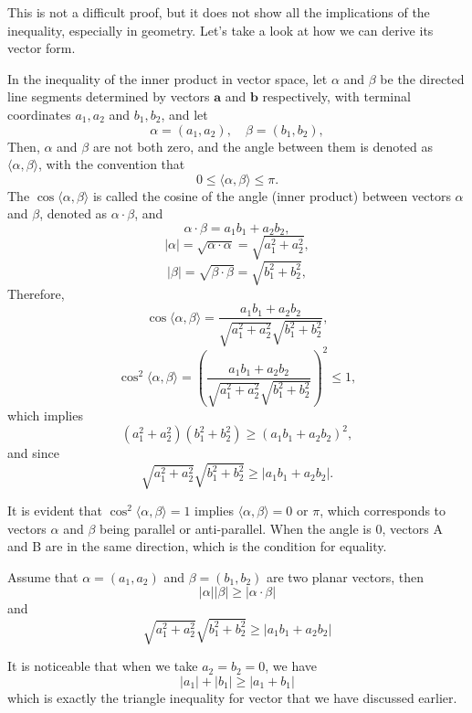 \documentclass[
	12pt, %
	fleqn, %
	a4paper, %
]{LegrandOrangeBook}
\begin{document}
This is not a difficult proof, but it does not show all the implications of the inequality, especially in
geometry. Let's take a look at how we can derive its vector form.

In the inequality of the inner product in vector space, let \(\alpha\) and \(\beta\) be the directed line segments determined by vectors \(\mathbf{a}\) and \(\mathbf{b}\) respectively, with terminal coordinates \(a_1, a_2\) and \(b_1, b_2\), and let
\[
\alpha = (a_1, a_2), \quad \beta = (b_1, b_2),
\]
Then, \(\alpha\) and \(\beta\) are not both zero, and the angle between them is denoted as \(\langle \alpha, \beta \rangle\), with the convention that
\[
0 \leq \langle \alpha, \beta \rangle \leq \pi.
\]
The \(\cos \langle \alpha, \beta \rangle\) is called the cosine of the angle (inner product) between vectors \(\alpha\) and \(\beta\), denoted as \(\alpha \cdot \beta\), and
\[
\alpha \cdot \beta = a_1b_1 + a_2b_2,
\]
\[
|\alpha| = \sqrt{\alpha \cdot \alpha} = \sqrt{a_1^2 + a_2^2},
\]
\[
|\beta| = \sqrt{\beta \cdot \beta} = \sqrt{b_1^2 + b_2^2},
\]
Therefore,
\[
\cos\langle \alpha, \beta \rangle = \frac{a_1b_1 + a_2b_2}{\sqrt{a_1^2 + a_2^2} \sqrt{b_1^2 + b_2^2}},
\]
\[
\cos^2\langle \alpha, \beta \rangle = \left(\frac{a_1b_1 + a_2b_2}{\sqrt{a_1^2 + a_2^2} \sqrt{b_1^2 + b_2^2}}\right)^2 \leq 1,
\]
which implies
\[
(a_1^2 + a_2^2)(b_1^2 + b_2^2) \geq (a_1b_1 + a_2b_2)^2,
\]
and since
\begin{equation}\label{CSvec}
    \sqrt{a_1^2 + a_2^2} \sqrt{b_1^2 + b_2^2} \geq |a_1b_1 + a_2b_2|.
\end{equation}

It is evident that \(\cos^2\langle \alpha, \beta \rangle = 1\) implies \(\langle \alpha, \beta \rangle = 0\) or \(\pi\), which corresponds to vectors \(\alpha\) and \(\beta\) being parallel or anti-parallel. When the angle is 0, vectors A and B are in the same direction, which is the condition for equality.

\begin{theorem}
    \label{CSvector}
    Assume that $\alpha = (a_1, a_2)$ and $\beta = (b_1, b_2)$ are two planar vectors, then
    $$|\alpha||\beta|\geq |\alpha \cdot \beta|$$
    and$$\sqrt{a_1^2 + a_2^2} \sqrt{b_1^2 + b_2^2} \geq |a_1b_1 + a_2b_2|$$
\end{theorem}   

It is noticeable that when we take $a_2=b_2=0$, we have
$$|a_1|+|b_1|\geq|a_1+b_1|$$
which is exactly the triangle inequality for vector that we have discussed earlier.
\end{document}
